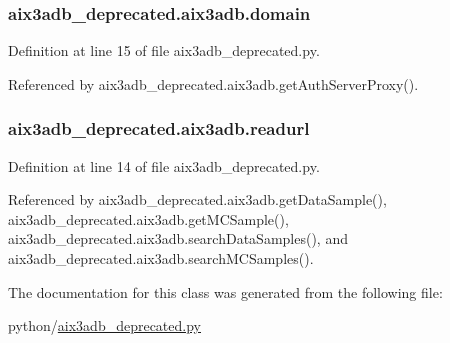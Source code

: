 \subsubsection[{domain}]{\setlength{\rightskip}{0pt plus 5cm}aix3adb\-\_\-deprecated.\-aix3adb.\-domain}\label{classaix3adb__deprecated_1_1aix3adb_a71fa095d2699a77af3fc32196db3c265}


Definition at line 15 of file aix3adb\-\_\-deprecated.\-py.



Referenced by aix3adb\-\_\-deprecated.\-aix3adb.\-get\-Auth\-Server\-Proxy().

\subsubsection[{readurl}]{\setlength{\rightskip}{0pt plus 5cm}aix3adb\-\_\-deprecated.\-aix3adb.\-readurl}\label{classaix3adb__deprecated_1_1aix3adb_a7d22b98dfb97d1a16a75189765efea2c}


Definition at line 14 of file aix3adb\-\_\-deprecated.\-py.



Referenced by aix3adb\-\_\-deprecated.\-aix3adb.\-get\-Data\-Sample(), aix3adb\-\_\-deprecated.\-aix3adb.\-get\-M\-C\-Sample(), aix3adb\-\_\-deprecated.\-aix3adb.\-search\-Data\-Samples(), and aix3adb\-\_\-deprecated.\-aix3adb.\-search\-M\-C\-Samples().



The documentation for this class was generated from the following file\-:\begin{DoxyCompactItemize}
\item 
python/\hyperlink{aix3adb__deprecated_8py}{aix3adb\-\_\-deprecated.\-py}\end{DoxyCompactItemize}
